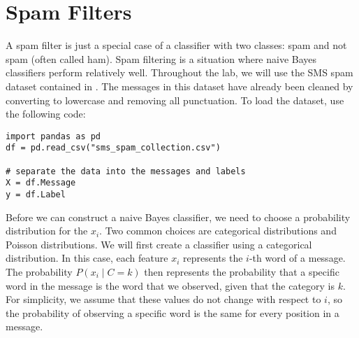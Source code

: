 \section*{Spam Filters}
A spam filter is just a special case of a classifier with two classes: spam and not spam (often called ham).
Spam filtering is a situation where naive Bayes classifiers perform relatively well.
Throughout the lab, we will use the SMS spam dataset contained in .
The messages in this dataset have already been cleaned by converting to lowercase and removing all punctuation.
To load the dataset, use the following code:
\begin{lstlisting}
import pandas as pd
df = pd.read_csv("sms_spam_collection.csv")

# separate the data into the messages and labels
X = df.Message
y = df.Label
\end{lstlisting}

Before we can construct a naive Bayes classifier, we need to choose a probability distribution for the $x_i$.
Two common choices are categorical distributions and Poisson distributions.
We will first create a classifier using a categorical distribution.
In this case, each feature $x_i$ represents the $i$-th word of a message.
The probability $P(x_i \mid C=k)$ then represents the probability that a specific word in the message is the word that we observed, given that the category is $k$.
For simplicity, we assume that these values do not change with respect to $i$, so the probability of observing a specific word is the same for every position in a message.

